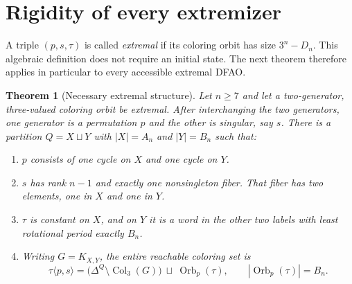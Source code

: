 \documentclass[11pt,a4paper]{article}
\numberwithin{equation}{section}
\newtheorem{theorem}{Theorem}[section]
\theoremstyle{definition}
\theoremstyle{remark}
\newcommand{\D}{\Delta}
\newcommand{\Orb}{\operatorname{Orb}}
\begin{document}
\section{Rigidity of every extremizer}\label{tor:sec:rigidity}

A triple $(p,s,\tau)$ is called \emph{extremal} if its coloring orbit has size
$3^n-D_n$. This algebraic definition does not require an initial state. The
next theorem therefore applies in particular to every accessible extremal
DFAO.

\begin{theorem}[Necessary extremal structure]\label{tor:thm:rigidity}
Let $n\ge7$ and let a two-generator, three-valued coloring orbit be extremal.
After interchanging the two generators, one generator is a permutation $p$
and the other is singular, say $s$. There is a partition $Q=X\sqcup Y$ with
$|X|=A_n$ and $|Y|=B_n$ such that:
\begin{enumerate}[label=\textup{(\roman*)}]
\item $p$ consists of one cycle on $X$ and one cycle on $Y$.
\item $s$ has rank $n-1$ and exactly one nonsingleton fiber. That fiber has
two elements, one in $X$ and one in $Y$.
\item $\tau$ is constant on $X$, and on $Y$ it is a word in the other two
labels with least rotational period exactly $B_n$.
\item Writing $G=K_{X,Y}$, the entire reachable coloring set is
\begin{equation}\label{tor:eq:saturated}
 \tau\langle p,s\rangle
 =\bigl(\D^Q\setminus\operatorname{Col}_3(G)\bigr)\ \sqcup\ \Orb_p(\tau),
 \qquad |\Orb_p(\tau)|=B_n.
\end{equation}
\end{enumerate}
\end{theorem}
\end{document}
